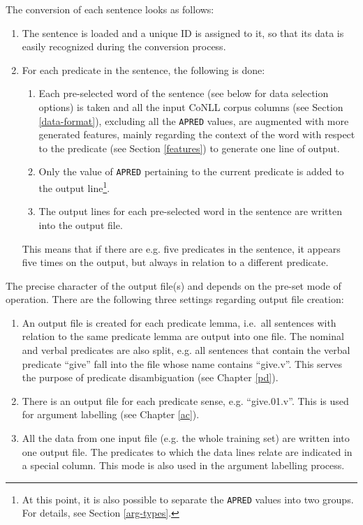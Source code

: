 \documentclass[12pt,notitlepage]{report}
\begin{document}
The conversion of each sentence looks as follows:
\begin{enumerate}
    \item The sentence is loaded and a unique ID is assigned to it, so that its data is easily recognized during the conversion process.
    \item For each predicate in the sentence, the following is done:
    \begin{enumerate}
        \item Each pre-selected word of the sentence (see below for data selection options) is taken and all the input CoNLL corpus columns (see Section \ref{data-format}), excluding all the \texttt{APRED} values, are augmented with more generated features, mainly regarding the context of the word with respect to the predicate (see Section \ref{features}) to generate one line of output.
        \item Only the value of \texttt{APRED} pertaining to the current predicate is added to the output line\footnote{At this point, it is also possible to separate the \texttt{APRED} values into two groups. For details, see Section \ref{arg-types}.}.
        \item The output lines for each pre-selected word in the sentence are written into the output file.
    \end{enumerate}
    This means that if there are e.g. five predicates in the sentence, it appears five times on the output, but always in relation to a different predicate.
\end{enumerate}

The precise character of the output file(s) and depends on the pre-set mode of operation. There are the following three settings regarding output file creation:
\begin{enumerate}
    \item An output file is created for each predicate lemma, i.e.\ all sentences with relation to the same predicate lemma are output into one file. The nominal and verbal predicates are also split, e.g. all sentences that contain the verbal predicate ``give'' fall into the file whose name contains ``give.v''. This serves the purpose of predicate disambiguation (see Chapter \ref{pd}).
    \item There is an output file for each predicate sense, e.g. ``give.01.v''. This is used for argument labelling (see Chapter \ref{ac}).
    \item All the data from one input file (e.g. the whole training set) are written into one output file. The predicates to which the data lines relate are indicated in a special column. This mode is also used in the argument labelling process.
\end{enumerate}
\end{document}
